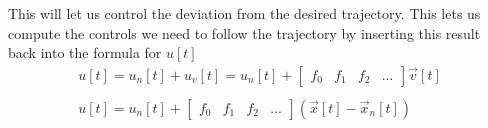 \documentclass{article}
\begin{document}
This will let us control the deviation from the desired trajectory.
This lets us compute the controls we need to follow the trajectory by inserting this result back into the formula for $u[t]$
\[
    \begin{array}{c}
        u[t] = u_n[t]+u_v[t] = u_n[t]+\left[
            \begin{array}{cccc}
                f_0 & f_1 & f_2 & ...
            \end{array}
        \right] \vec{v}[t] \\\\
        u[t] = u_n[t]+\left[
            \begin{array}{cccc}
                f_0 & f_1 & f_2 & ...
            \end{array}
        \right] (\vec{x}[t]-\vec{x}_n[t])
    \end{array}
\]
\end{document}
